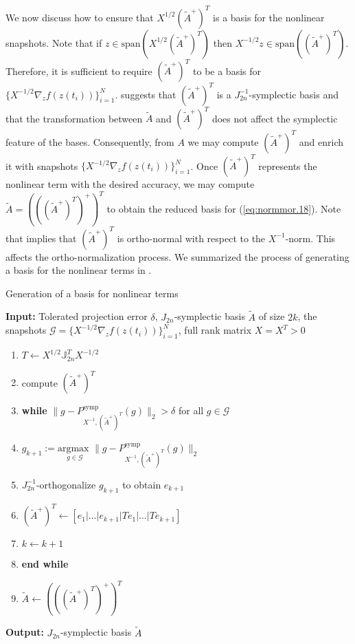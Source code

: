 We now discuss how to ensure that $X^{1/2} (\tilde A^+)^T$ is a basis for the nonlinear snapshots. Note that if $z \in \text{span}\left(X^{1/2} (\tilde A^+)^T\right)$ then $X^{-1/2} z \in \text{span}\left(( \tilde A^+)^T \right)$. Therefore, it is sufficient to require $(\tilde A^+)^T$ to be a basis for $\{X^{-1/2} \nabla_z f(z(t_i))\}_{i=1}^N$.  suggests that $(\tilde A^+)^T$ is a $J_{2n}^{-1}$-symplectic basis and that the transformation between $\tilde A$ and $(\tilde A^+)^T $ does not affect the symplectic feature of the bases. Consequently, from $A$ we may compute $(\tilde A^+)^T$ and enrich it with snapshots $\{X^{-1/2} \nabla_z f(z(t_i))\}_{i=1}^N$. Once $(\tilde A^+)^T$ represents the nonlinear term with the desired accuracy, we may compute $\tilde A= \left( \left( ( \tilde A^+ )^T \right)^+ \right)^T$ to obtain the reduced basis for (\ref{eq:normmor.18}). Note that  implies that $(\tilde A^+)^T$ is ortho-normal with respect to the $X^{-1}$-norm. This affects the ortho-normalization process. We summarized the process of generating a basis for the nonlinear terms in .

\begin{algorithm} 
\caption{Generation of a basis for nonlinear terms} \label{alg:3}
{\bf Input:} Tolerated projection error $\delta$, $J_{2n}$-symplectic basis $\tilde A$ of size $2k$, the snapshots $\mathcal G = \{X^{-1/2} \nabla_zf(z(t_i))\}_{i=1}^{N}$, full rank matrix $X=X^T>0$
\begin{enumerate}
\item $T \leftarrow X^{1/2}\mathbb J_{2n}^T X^{-1/2}$
\item compute $(\tilde A^+)^T$
\item \textbf{while} $\| g - P^\text{symp}_{X^{-1},(\tilde A^+)^T}( g ) \|_2 > \delta$ for all $g \in \mathcal G$
\item \hspace{0.5cm} $g_{k+1} := \underset{g\in \mathcal G}{\text{argmax }} \| g - P^\text{symp}_{X^{-1},(\tilde A^+)^T}( g ) \|_2$
\item \hspace{0.5cm} $J_{2n}^{-1}$-orthogonalize $ g_{k+1}$ to obtain $e_{k+1}$
\item \hspace{0.5cm} $(\tilde A^+)^T \leftarrow [e_1|\dots |e_{k+1} | Te_1|\dots| Te_{k+1}]$
\item \hspace{0.5cm} $k \leftarrow k+1$
\item \textbf{end while}
\item $\tilde A \leftarrow \left( \left( ( \tilde A^+ )^T \right)^+ \right)^T$
\end{enumerate}
\vspace{0.5cm}
{\bf Output:} $J_{2n}$-symplectic basis $\tilde A$
\end{algorithm}

